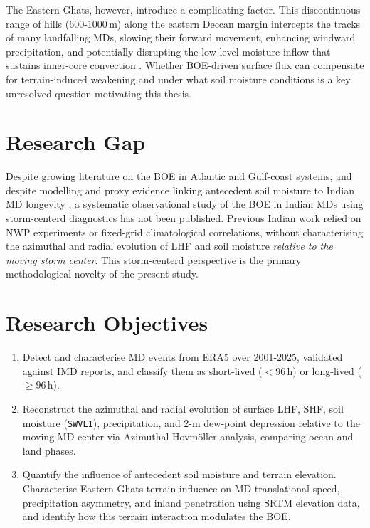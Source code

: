 The Eastern Ghats, however, introduce a complicating factor. This
discontinuous range of hills (600-1000\,m) along the eastern Deccan
margin intercepts the tracks of many landfalling MDs, slowing their
forward movement, enhancing windward precipitation, and potentially
disrupting the low-level moisture inflow that sustains inner-core
convection \citep{houze1994}. Whether BOE-driven surface flux can
compensate for terrain-induced weakening and under what soil moisture
conditions is a key unresolved question motivating this thesis.

\section{Research Gap}
\label{sec:intro_gap}

Despite growing literature on the BOE in Atlantic and Gulf-coast
systems, and despite modelling and proxy evidence linking antecedent
soil moisture to Indian MD longevity \citep{kishtawal2013enhancement,
osuri2020, hunt2017effect}, a systematic observational study of the
BOE in Indian MDs using storm-centerd diagnostics has not been
published. Previous Indian work relied on NWP experiments or
fixed-grid climatological correlations, without characterising the
azimuthal and radial evolution of LHF and soil moisture
\emph{relative to the moving storm center}. This storm-centerd
perspective is the primary methodological novelty of the present study.

\section{Research Objectives}
\label{sec:intro_objectives}

\begin{enumerate}
  \item Detect and characterise MD events from ERA5 over 2001-2025,
    validated against IMD reports, and classify them as short-lived
    ($<96$\,h) or long-lived ($\geq 96$\,h).
  \item Reconstruct the azimuthal and radial evolution of surface LHF,
    SHF, soil moisture (\texttt{SWVL1}), precipitation, and 2-m dew-point
    depression relative to the moving MD center via Azimuthal
    Hovm\"{o}ller analysis, comparing ocean and land phases.
  \item Quantify the influence of antecedent soil moisture and
    terrain elevation. Characterise Eastern Ghats terrain influence
    on MD translational speed, precipitation asymmetry, and inland
    penetration using SRTM elevation data, and identify how this
    terrain interaction modulates the BOE.
\end{enumerate}

